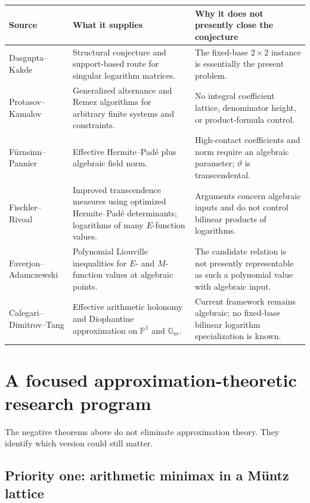 \documentclass[11pt,oneside]{article}
\theoremstyle{definition}
\theoremstyle{remark}
\newcommand{\thetaq}{\vartheta}
\begin{document}
\begin{center}
\begin{tabularx}{0.97\textwidth}{@{}>{\raggedright\arraybackslash}p{}X X@{}}
\toprule
Source & What it supplies & Why it does not presently close the conjecture\\
\midrule
Dasgupta--Kakde & Structural conjecture and support-based route for singular logarithm matrices. & The fixed-base \(2\times2\) instance is essentially the present problem.\\
\addlinespace
Protasov--Kamalov & Generalized alternance and Remez algorithms for arbitrary finite systems and constraints. & No integral coefficient lattice, denominator height, or product-formula control.\\
\addlinespace
F\"urnsinn--Pannier & Effective Hermite--Pad\'e plus algebraic field norm. & High-contact coefficients and norm require an algebraic parameter; \(\thetaq\) is transcendental.\\
\addlinespace
Fischler--Rivoal & Improved transcendence measures using optimized Hermite--Pad\'e determinants; logarithms of many \(E\)-function values. & Arguments concern algebraic inputs and do not control bilinear products of logarithms.\\
\addlinespace
Faverjon--Adamczewski & Polynomial Liouville inequalities for \(E\)- and \(M\)-function values at algebraic points. & The candidate relation is not presently representable as such a polynomial value with algebraic input.\\
\addlinespace
Calegari--Dimitrov--Tang & Effective arithmetic holonomy and Diophantine approximation on \(\mathbb P^1\) and \(\mathbb G_m\). & Current framework remains algebraic; no fixed-base bilinear logarithm specialization is known.\\
\bottomrule
\end{tabularx}
\end{center}

\section{A focused approximation-theoretic research program}
\label{pa:sec-program}

The negative theorems above do not eliminate approximation theory.  They identify which
version could still matter.

\subsection{Priority one: arithmetic minimax in a M\"untz lattice}
\end{document}

